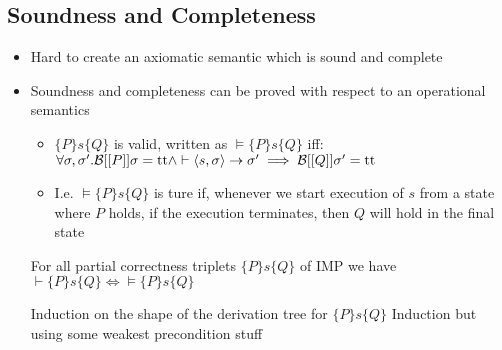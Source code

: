 \begin{itemize}
\begin{itemize}
        \end{itemize}
\end{itemize}

\subsection{Soundness and Completeness}
\begin{itemize}
     If a property can be prove then it does indeed hold
        \begin{itemize}
            \item $\vdash \{P\} s \{Q\}  \implies \models \{P\} s \{Q\}$
        \end{itemize}
     If a property does hold then it can be proved
        \begin{itemize}
            \item $\models \{P\} s \{Q\} \implies \vdash \{P\} s \{Q\}$
        \end{itemize}
    \item Hard to create an axiomatic semantic which is sound and complete
    \item Soundness and completeness can be proved with respect to an operational semantics
        \begin{itemize}
            \item $\{P\} s \{Q\}$ is valid, written as $\models \{P\} s \{Q\}$ iff:\\ $\forall \sigma, \sigma'. \mathcal{B}[[P]]\sigma = \text{tt} \wedge \vdash \langle s, \sigma \rangle \to \sigma' \implies \mathcal{B}[[Q]] \sigma' = \text{tt}$
            \item I.e. $\models \{P\} s \{Q\}$ is ture if, whenever we start execution of $s$ from a state where $P$ holds, if the execution terminates, then $Q$ will hold in the final state
        \end{itemize}
     For all partial correctness triplets $\{P\} s \{Q\}$ of IMP we have $\vdash \{P\} s \{Q\} \iff \models \{P\} s \{Q\}$
        \begin{itemize}
                \begin{itemize}
                    \ides{$\mathbf{\Rightarrow}$:} Induction on the shape of the derivation tree for $\{P\} s \{Q\}$
                    \ides{$\mathbf{\Leftarrow}$:} Induction but using some weakest precondition stuff
                \end{itemize}
        \end{itemize}
\end{itemize}
